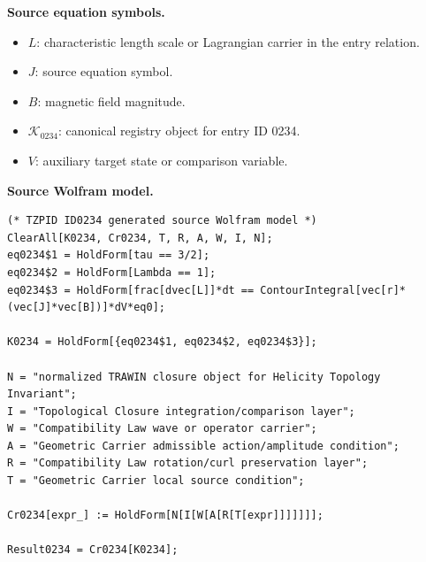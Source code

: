 \begin{minipage}[t]{0.49\linewidth}
\begingroup
\small
\raggedright
\textbf{Source equation symbols.}\par
\begin{itemize}[leftmargin=1.35em,itemsep=1pt,topsep=1pt,parsep=0pt]
    \item $L$: characteristic length scale or Lagrangian carrier in the entry relation.
    \item $J$: source equation symbol.
    \item $B$: magnetic field magnitude.
    \item $\mathcal{K}_{0234}$: canonical registry object for entry ID 0234.
    \item $V$: auxiliary target state or comparison variable.
\end{itemize}
\endgroup
\end{minipage}\hfill
\begin{minipage}[t]{0.47\linewidth}
\begingroup
\scriptsize
\raggedright
\textbf{Source Wolfram model.}\par
\begin{Verbatim}[fontsize=\tiny,breaklines=true,breakanywhere=true]
(* TZPID ID0234 generated source Wolfram model *)
ClearAll[K0234, Cr0234, T, R, A, W, I, N];
eq0234$1 = HoldForm[tau == 3/2];
eq0234$2 = HoldForm[Lambda == 1];
eq0234$3 = HoldForm[frac[dvec[L]]*dt == ContourIntegral[vec[r]*(vec[J]*vec[B])]*dV*eq0];

K0234 = HoldForm[{eq0234$1, eq0234$2, eq0234$3}];

N = "normalized TRAWIN closure object for Helicity Topology Invariant";
I = "Topological Closure integration/comparison layer";
W = "Compatibility Law wave or operator carrier";
A = "Geometric Carrier admissible action/amplitude condition";
R = "Compatibility Law rotation/curl preservation layer";
T = "Geometric Carrier local source condition";

Cr0234[expr_] := HoldForm[N[I[W[A[R[T[expr]]]]]]];

Result0234 = Cr0234[K0234];
\end{Verbatim}
\endgroup
\end{minipage}

